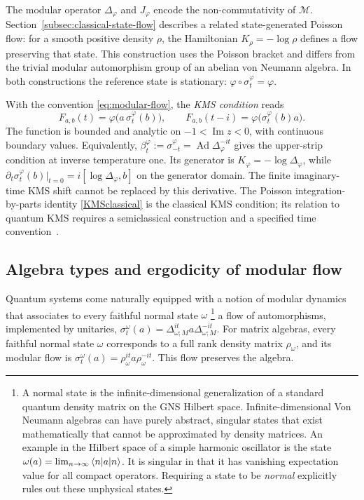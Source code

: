 \documentclass[a4paper,11pt]{article}
\theoremstyle{definition}
\begin{document}
The modular operator $\Delta_\varphi$ and $J_\varphi$ encode the non-commutativity of
$\mathcal M$. Section~\ref{subsec:classical-state-flow} describes a related
state-generated Poisson flow: for a smooth positive density $\rho$, the Hamiltonian
$K_\rho=-\log\rho$ defines a flow preserving that state. This construction uses
the Poisson bracket and differs from the trivial modular automorphism group of
an abelian von Neumann algebra. In both constructions the reference state is stationary:
$\varphi\circ\sigma_t^\varphi=\varphi$.

With the convention \eqref{eq:modular-flow}, the \emph{KMS condition} reads
\begin{equation}
 F_{a,b}(t)=\varphi\bigl(a\,\sigma_t^\varphi(b)\bigr),
 \qquad F_{a,b}(t-i)=\varphi\bigl(\sigma_t^\varphi(b)a\bigr).
 \label{eq:KMS-function}
\end{equation}
The function is bounded and analytic on $-1<\operatorname{Im}z<0$, with continuous
boundary values. Equivalently, $\beta_t^\varphi:=\sigma_{-t}^\varphi
=\operatorname{Ad}\Delta_\varphi^{-it}$ gives the upper-strip condition at inverse
temperature one. Its generator is $K_\varphi=-\log\Delta_\varphi$, while
$\partial_t\sigma_t^\varphi(b)|_{t=0}=i[\log\Delta_\varphi,b]$ on the generator domain.
The finite imaginary-time KMS shift cannot be replaced by this derivative.
The Poisson integration-by-parts identity \eqref{KMSclassical} is the classical
KMS condition; its relation to quantum KMS requires a semiclassical construction
and a specified time convention~\cite{vanDeVen2022}.

\subsection{Algebra types and ergodicity of modular flow}

Quantum systems come naturally equipped with a notion of modular dynamics that associates to every faithful normal state $\omega$ \footnote{A normal state is the infinite-dimensional generalization of a standard quantum density matrix on the GNS Hilbert space. Infinite-dimensional Von Neumann algebras can have purely abstract, singular states that exist mathematically that cannot be approximated by density matrices. An example in the Hilbert space of a simple harmonic oscillator is the state $\omega(a)=\lim_{n\to \infty}\braket{n|a|n}$. It is singular in that it has vanishing expectation value for all compact operators. Requiring a state to be {\it normal} explicitly rules out these unphysical states.} a flow of automorphisms, implemented by unitaries,
$\sigma^{\omega}_t(a)=\Delta_{\omega;M}^{it}a\Delta_{\omega;M}^{-it}$.
For matrix algebras, every faithful normal state $\omega$ corresponds to a full rank density matrix $\rho_\omega$, and its modular flow is $\sigma^{\omega}_t(a)=\rho_\omega^{it}a\rho_\omega^{-it}$. This flow preserves the algebra.
\end{document}
